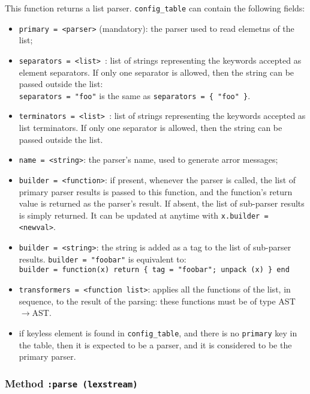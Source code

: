 This function returns a list parser. \verb|config_table| can contain
the following fields:
\begin{itemize}

\item\verb|primary = <parser>| (mandatory): the parser used to read
  elemetns of the list;

\item\verb|separators = <list> |: list of strings representing the
  keywords accepted as element separators. If only one separator is
  allowed, then the string can be passed outside the list:\\
  \verb|separators = "foo"| is the same as 
  \verb|separators = { "foo" }|.

\item\verb|terminators = <list> |: list of strings representing the
  keywords accepted as list terminators. If only one separator is
  allowed, then the string can be passed outside the list.

\item\verb|name = <string>|: the parser's name, used to generate arror
  messages;

\item\verb|builder = <function>|: if present, whenever the parser is
  called, the list of primary parser results is passed to this
  function, and the function's return value is returned as the
  parser's result. If absent, the list of sub-parser results is simply
  returned. It can be updated at anytime with
  \verb|x.builder = <newval>|.

\item\verb|builder = <string>|: the string is added as a tag to the
  list of sub-parser results. \verb|builder = "foobar"| is equivalent
  to:\\
 \verb|builder = function(x) return { tag = "foobar"; unpack (x) } end|

\item\verb|transformers = <function list>|: applies all the functions
  of the list, in sequence, to the result of the parsing: these
  functions must be of type AST$\rightarrow$AST.

\item if keyless element is found in \verb|config_table|, and there is
  no \verb|primary| key in the table, then it is expected to be a
  parser, and it is considered to be the primary parser.
\end{itemize}

\subsubsection{Method {\tt :parse (lexstream)}}

